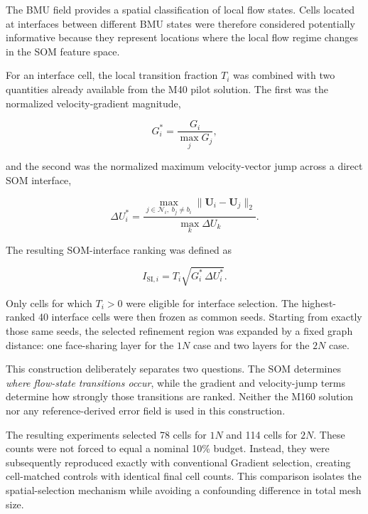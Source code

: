The BMU field provides a spatial classification of local flow states. Cells
located at interfaces between different BMU states were therefore considered
potentially informative because they represent locations where the local flow
regime changes in the SOM feature space.

For an interface cell, the local transition fraction \(T_i\) was combined
with two quantities already available from the M40 pilot solution. The first
was the normalized velocity-gradient magnitude,

\begin{equation}
G_i^* =
\frac{G_i}{\max_j G_j},
\end{equation}

and the second was the normalized maximum velocity-vector jump across a
direct SOM interface,

\begin{equation}
\Delta U_i^* =
\frac{
\max_{j\in\mathcal{N}_i,\;b_j\neq b_i}
\|\mathbf{U}_i-\mathbf{U}_j\|_2
}{
\max_k \Delta U_k
}.
\end{equation}

The resulting SOM-interface ranking was defined as

\begin{equation}
I_{\mathrm{SI},i}
=
T_i
\sqrt{G_i^*\,\Delta U_i^*}.
\end{equation}

Only cells for which \(T_i>0\) were eligible for interface selection. The
highest-ranked 40 interface cells were then frozen as common seeds. Starting
from exactly those same seeds, the selected refinement region was expanded by
a fixed graph distance: one face-sharing layer for the \(1N\) case and two
layers for the \(2N\) case.

This construction deliberately separates two questions. The SOM determines
\emph{where flow-state transitions occur}, while the gradient and
velocity-jump terms determine how strongly those transitions are ranked.
Neither the M160 solution nor any reference-derived error field is used in
this construction.

The resulting experiments selected 78 cells for \(1N\) and 114 cells for
\(2N\). These counts were not forced to equal a nominal 10\% budget.
Instead, they were subsequently reproduced exactly with conventional
Gradient selection, creating cell-matched controls with identical final
cell counts. This comparison isolates the spatial-selection mechanism while
avoiding a confounding difference in total mesh size.

